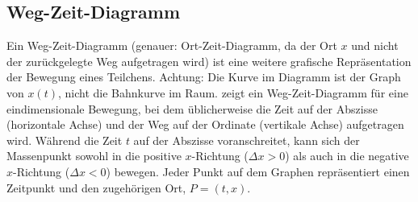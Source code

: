 \subsection{Weg-Zeit-Diagramm}\label{subsec: weg-zeit-diagramm}
Ein Weg-Zeit-Diagramm (genauer: Ort-Zeit-Diagramm, da der Ort $x$ und nicht der zurückgelegte Weg aufgetragen wird) ist eine weitere grafische Repräsentation der Bewegung eines Teilchens. Achtung: Die Kurve im Diagramm ist der Graph von $x(t)$, nicht die Bahnkurve im Raum.  zeigt ein Weg-Zeit-Diagramm für eine eindimensionale Bewegung, bei dem üblicherweise die Zeit auf der Abszisse (horizontale Achse) und der Weg auf der Ordinate (vertikale Achse) aufgetragen wird. Während die Zeit $t$ auf der Abszisse voranschreitet, kann sich der Massenpunkt sowohl in die positive $x$-Richtung ($\Delta x > 0$) als auch in die negative $x$-Richtung ($\Delta x < 0$) bewegen. Jeder Punkt auf dem Graphen repräsentiert einen Zeitpunkt und den zugehörigen Ort, $P = (t,x)$.
